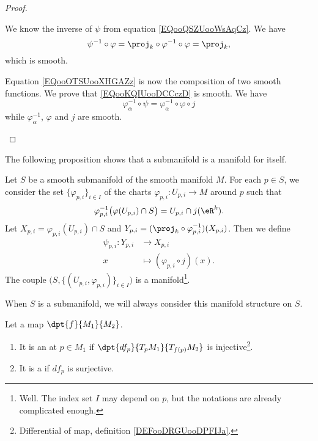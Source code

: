 \begin{proof}
\begin{subproof}
		We know the inverse of \( \psi\) from equation \eqref{EQooQSZUooWsAqCz}. We have
		\begin{equation}
			\psi^{-1}\circ\varphi=\proj_k\circ\varphi^{-1}\circ\varphi=\proj_k,
		\end{equation}
		which is smooth.

		Equation \eqref{EQooOTSUooXHGAZz} is now the composition of two smooth functions.
		We prove that \eqref{EQooKQIUooDCCczD} is smooth. We have
		\begin{equation}
			\varphi_{\alpha}^{-1}\circ\psi=\varphi_{\alpha}^{-1}\circ\varphi\circ j
		\end{equation}
		while \( \varphi_{\alpha}^{-1}\), \( \varphi\) and \( j\) are smooth.
	\end{subproof}
\end{proof}

The following proposition shows that a submanifold is a manifold for itself.
\begin{proposition}      \label{PROPooRZIHooXIhnpq}
	Let \( S\) be a smooth submanifold of the smooth manifold \( M\). For each \( p\in S\), we consider the set \( \{ \varphi_{p,i} \}_{i\in I}\) of the charts \( \varphi_{p,i}\colon U_{p,i}\to M\) around \( p\) such that
	\begin{equation}
		\varphi_{p,i}^{-1}\big( \varphi(U_{p,i})\cap S \big)=U_{p,i}\cap j(\eR^k).
	\end{equation}
	Let \( X_{p,i}=\varphi_{p,i}(U_{p,i})\cap S\) and \( Y_{p,i}=(\proj_k\circ\varphi_{p,i}^{-1})(X_{p,i})\). Then we define
	\begin{equation}
		\begin{aligned}
			\psi_{p,i}\colon Y_{p,i} & \to X_{p,i}                        \\
			x                        & \mapsto (\varphi_{p,i}\circ j)(x).
		\end{aligned}
	\end{equation}
	The couple \( \big( S,\{ (U_{p,i},\varphi_{p,i}) \}_{i\in I} \big)\) is a manifold\footnote{Well. The index set \( I\) may depend on \( p\), but the notations are already complicated enough.}.

	When \( S\) is a submanifold, we will always consider this manifold structure on \( S\).
\end{proposition}

\begin{definition}      \label{DEFooZKUIooXWVGvh}
	Let a map $\dpt{f}{M_1}{M_2}$.
	\begin{enumerate}
		\item
		      It is an  at $p\in M_1$ if $\dpt{df_p}{T_pM_1}{T_{f(p)}M_2}$ is injective\footnote{Differential of map, definition \ref{DEFooDRGUooDPFIJa}.}.
		\item
		      It is a  if $df_p$ is surjective.
	\end{enumerate}
\end{definition}



